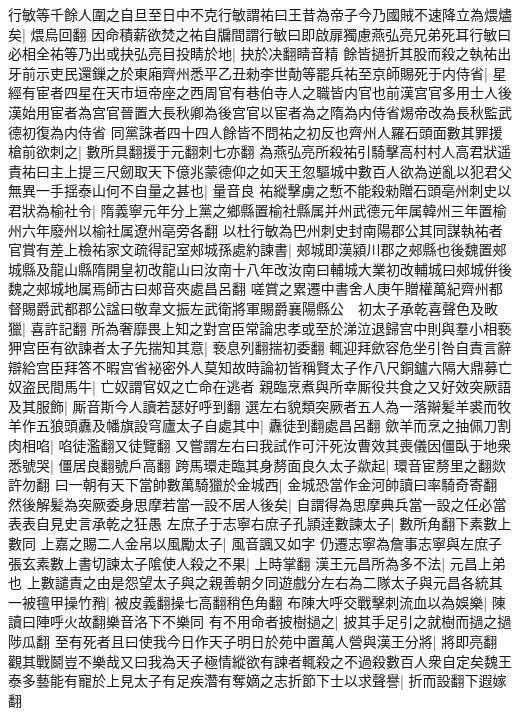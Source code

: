 行敏等千餘人圍之自旦至日中不克行敏謂祐曰王昔為帝子今乃國賊不速降立為煨燼矣|{
	煨烏回翻}
因命積薪欲焚之祐自牖間謂行敏曰即啟扉獨慮燕弘亮兄弟死耳行敏曰必相全祐等乃出或抉弘亮目投睛於地|{
	抉於决翻睛音精}
餘皆撾折其股而殺之執祐出牙前示吏民還鏁之於東廂齊州悉平乙丑勑李世勣等罷兵祐至京師賜死于内侍省|{
	星經有宦者四星在天市垣帝座之西周官有巷伯寺人之職皆内官也前漢宫官多用士人後漢始用宦者為宫官晉置大長秋卿為後宫官以宦者為之隋為内侍省焬帝改為長秋監武德初復為内侍省}
同黨誅者四十四人餘皆不問祐之初反也齊州人羅石頭面數其罪援槍前欲刺之|{
	數所具翻援于元翻刺七亦翻}
為燕弘亮所殺祐引騎擊高村村人高君狀遥責祐曰主上提三尺劒取天下億兆蒙德仰之如天王忽驅城中數百人欲為逆亂以犯君父無異一手揺泰山何不自量之甚也|{
	量音良}
祐縱擊虜之慙不能殺勑贈石頭亳州刺史以君狀為榆社令|{
	隋義寧元年分上黨之鄉縣置榆社縣属并州武德元年属韓州三年置榆州六年廢州以榆社属遼州亳旁各翻}
以杜行敏為巴州刺史封南陽郡公其同謀執祐者官賞有差上檢祐家文疏得記室郟城孫處約諫書|{
	郟城即漢潁川郡之郟縣也後魏置郟城縣及龍山縣隋開皇初改龍山曰汝南十八年改汝南曰輔城大業初改輔城曰郟城倂後魏之郟城地属焉師古曰郟音夾處昌呂翻}
嗟賞之累遷中書舍人庚午贈權萬紀齊州都督賜爵武都郡公諡曰敬韋文振左武衛將軍賜爵襄陽縣公　初太子承乾喜聲色及畋獵|{
	喜許記翻}
所為奢靡畏上知之對宫臣常論忠孝或至於涕泣退歸宫中則與羣小相䙝狎宫臣有欲諫者太子先揣知其意|{
	䙝息列翻揣初委翻}
輒迎拜歛容危坐引咎自責言辭辯給宫臣拜答不暇宫省袐密外人莫知故時論初皆稱賢太子作八尺銅鑪六隔大鼎募亡奴盗民間馬牛|{
	亡奴謂官奴之亡命在逃者}
親臨烹煮與所幸厮役共食之又好效突厥語及其服飾|{
	厮音斯今人讀若瑟好呼到翻}
選左右貌類突厥者五人為一落辮髪羊裘而牧羊作五狼頭纛及幡旗設穹廬太子自處其中|{
	纛徒到翻處昌呂翻}
歛羊而烹之抽佩刀割肉相啗|{
	啗徒濫翻又徒覽翻}
又嘗謂左右曰我試作可汗死汝曹效其喪儀因僵臥于地衆悉號哭|{
	僵居良翻號戶高翻}
跨馬環走臨其身剺面良久太子歘起|{
	環音宦剺里之翻欻許勿翻}
曰一朝有天下當帥數萬騎獵於金城西|{
	金城恐當作金河帥讀曰率騎奇寄翻}
然後解髪為突厥委身思摩若當一設不居人後矣|{
	自謂得為思摩典兵當一設之任必當表表自見史言承乾之狂愚}
左庶子于志寧右庶子孔頴逹數諫太子|{
	數所角翻下素數上數同}
上嘉之賜二人金帛以風勵太子|{
	風音諷又如字}
仍遷志寧為詹事志寧與左庶子張玄素數上書切諫太子隂使人殺之不果|{
	上時掌翻}
漢王元昌所為多不法|{
	元昌上弟也}
上數譴責之由是怨望太子與之親善朝夕同遊戲分左右為二隊太子與元昌各統其一被氊甲操竹矟|{
	被皮義翻操七高翻稍色角翻}
布陳大呼交戰擊刺流血以為娛樂|{
	陳讀曰陣呼火故翻樂音洛下不樂同}
有不用命者披樹撾之|{
	披其手足引之就樹而撾之撾陟瓜翻}
至有死者且曰使我今日作天子明日於苑中置萬人營與漢王分將|{
	將即亮翻}
觀其戰鬬豈不樂哉又曰我為天子極情縱欲有諫者輒殺之不過殺數百人衆自定矣魏王泰多藝能有寵於上見太子有足疾濳有奪嫡之志折節下士以求聲譽|{
	折而設翻下遐嫁翻}
